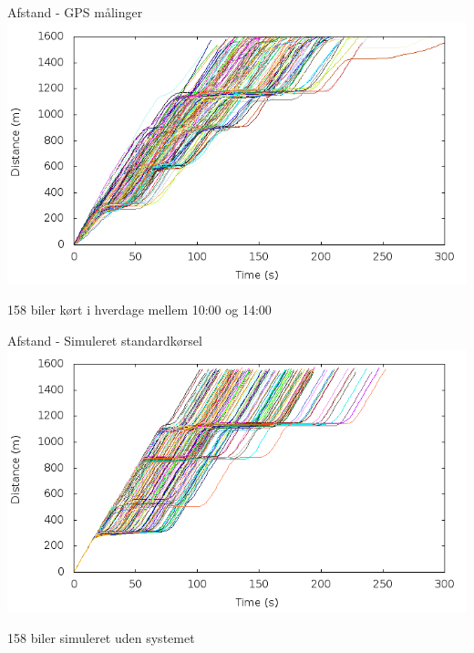 \begin{frame}{Afstand - GPS målinger}
\includegraphics[width=1\textwidth]{../images/Real/RealDistance.png}

158 biler kørt i hverdage mellem 10:00 og 14:00
\end{frame}

\begin{frame}{Afstand - Simuleret standardkørsel}
\includegraphics[width=1\textwidth]{../images/tp0c0_8/distanceUncontrolled0.png}

158 biler simuleret uden systemet
\end{frame}


